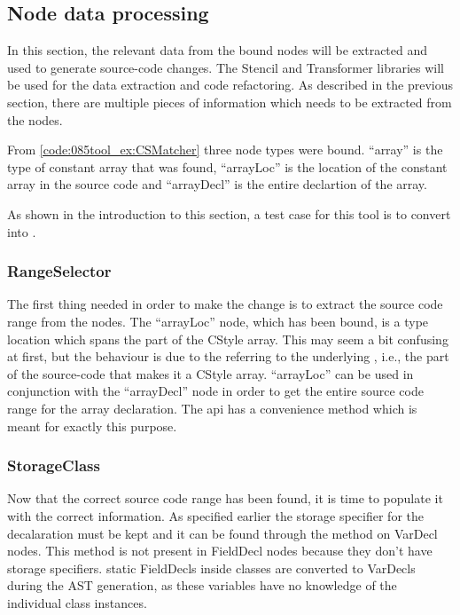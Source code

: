\subsection{Node data processing}

In this section, the relevant data from the bound nodes will be extracted and used to generate source-code changes. The Stencil and Transformer libraries will be used for the data extraction and code refactoring.
As described in the previous section, there are multiple pieces of information which needs to be extracted from the nodes. 

From \cref{code:085tool_ex:CSMatcher} three node types were bound. ``array'' is the type of constant array that was found, ``arrayLoc'' is the location of the constant array in the source code and ``arrayDecl'' is the entire declartion of the array.

As shown in the introduction to this section, a test case for this tool is to convert  into .

\subsubsection*{RangeSelector}
The first thing needed in order to make the change is to extract the source code range from the nodes. The ``arrayLoc'' node, which has been bound, is a type location which spans the \cppinline{[2]} part of the CStyle array.
This may seem a bit confusing at first, but the behaviour is due to the  referring to the underlying , i.e., the part of the source-code that makes it a CStyle array.
``arrayLoc'' can be used in conjunction with the ``arrayDecl'' node in order to get the entire source code range for the array declaration. The  api has a convenience method  which is meant for exactly this purpose.

\subsubsection*{StorageClass}
Now that the correct source code range has been found, it is time to populate it with the correct information. As specified earlier the storage specifier for the decalaration must be kept and it can be found through the  method on VarDecl nodes. This method is not present in FieldDecl nodes because they don't have storage specifiers. static FieldDecls inside classes are converted to VarDecls during the AST generation, as these variables have no knowledge of the individual class instances. 

